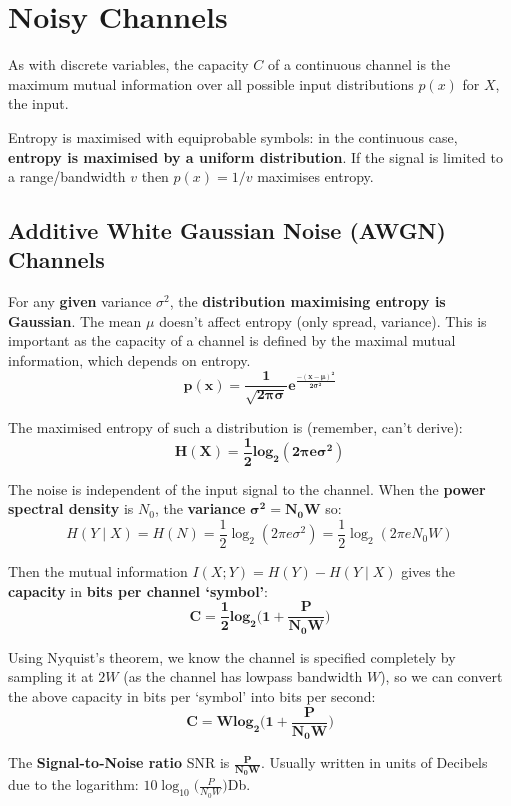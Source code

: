 \documentclass[a4paper, 11pt]{article}
\begin{document}
\section*{Noisy Channels}
{
    As with discrete variables, the capacity \(C\) of a continuous channel is the maximum mutual information over all possible input distributions \(p(x)\) for \(X\), the input.

    Entropy is maximised with equiprobable symbols: in the continuous case, \textbf{entropy is maximised by a uniform distribution}. If the signal is limited to a range/bandwidth \(v\) then \(p(x) = 1/v\) maximises entropy.

    \subsection*{Additive White Gaussian Noise (AWGN) Channels}
    {
        For any \textbf{given} variance \(\sigma^2\), the \textbf{distribution maximising entropy is Gaussian}. The mean \(\mu\) doesn't affect entropy (only spread, variance). This is important as the capacity of a channel is defined by the maximal mutual information, which depends on entropy.
        \[\bm{p(x) = \frac{1}{\sqrt{2\pi\sigma}}e^\frac{-(x-\mu)^2}{2\sigma^2}}\]

        The maximised entropy of such a distribution is (remember, can't derive):
        \[\bm{H(X) = \frac{1}{2}\textbf{log}_2(2\pi e \sigma^2)}\]

        The noise is independent of the input signal to the channel. When the \textbf{power spectral density} is \(N_0\), the \textbf{variance} \(\bm{\sigma^2 = N_0 W}\) so:
        \[H(Y \mid X) = H(N) = \frac{1}{2}\log_2(2\pi e \sigma^2) = \frac{1}{2}\log_2(2\pi e N_0 W)\]

        Then the mutual information \(I(X;Y) = H(Y) - H(Y \mid X)\) gives the \textbf{capacity} in \textbf{bits per channel `symbol'}:
        \[\bm{C = \frac{1}{2}\textbf{log}_2\Bigg(1 + \frac{P}{N_0 W}\Bigg)}\]

        Using Nyquist's theorem, we know the channel is specified completely by sampling it at \(2W\) (as the channel has lowpass bandwidth \(W\)), so we can convert the above capacity in bits per `symbol' into bits per second:
        \[\bm{C = W\textbf{log}_2\Bigg(1 + \frac{P}{N_0 W}\Bigg)}\]

        The \textbf{Signal-to-Noise ratio} SNR is \(\bm{\displaystyle \frac{P}{N_0 W}}\). Usually written in units of Decibels due to the logarithm: \(\displaystyle 10\log_{10}\Bigg(\frac{P}{N_0 W}\Bigg)\)Db.

}}
\end{document}

